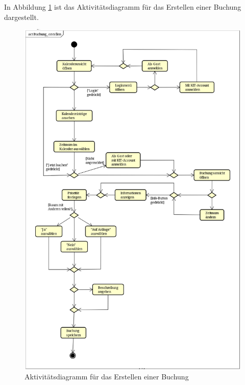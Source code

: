 In Abbildung \ref{fig:activity_diagram_booking} ist das Aktivitätsdiagramm für das Erstellen einer Buchung dargestellt.
\begin{figure}[ht]
    \centering
    \includegraphics[scale=0.15]{figures/activitydiagrams/buchungerstellen}
    \caption{Aktivitätsdiagramm für das Erstellen einer Buchung}
    \label{fig:activity_diagram_booking}
\end{figure}


\clearpage
